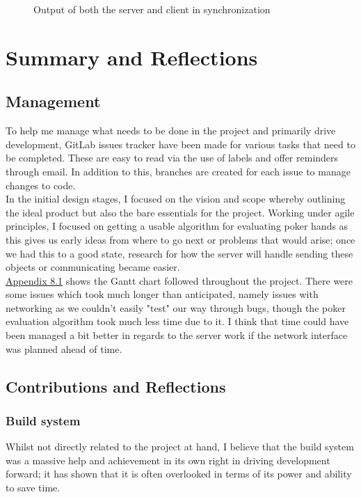 \documentclass[11pt]{article}
\begin{document}
\begin{figure}[h]
	\caption{Output of both the server and client in synchronization}
\end{figure}


\newpage
\section{Summary and Reflections}
\subsection{Management}
To help me manage what needs to be done in the project and primarily drive development, GitLab issues tracker have been made for various tasks that need to be completed. These are easy to read via the use of labels and offer reminders through email. In addition to this, branches are created for each issue to manage changes to code. \\

In the initial design stages, I focused on the vision and scope whereby outlining the ideal product but also the bare essentials for the project. Working under agile principles, I focused on getting a usable algorithm for evaluating poker hands as this gives us early ideas from where to go next or problems that would arise; once we had this to a good state, research for how the server will handle sending these objects or communicating became easier.  \\

\hyperlink{app_gantt}{Appendix 8.1} shows the Gantt chart followed throughout the project. There were some issues which took much longer than anticipated, namely issues with networking as we couldn't easily "test" our way through bugs, though the poker evaluation algorithm took much less time due to it. I think that time could have been managed a bit better in regards to the server work if the network interface was planned ahead of time.

\subsection{Contributions and Reflections}

\subsubsection{Build system}
Whilst not directly related to the project at hand, I believe that the build system was a massive help and achievement in its own right in driving development forward; it has shown that it is often overlooked in terms of its power and ability to save time. \\
\end{document}
